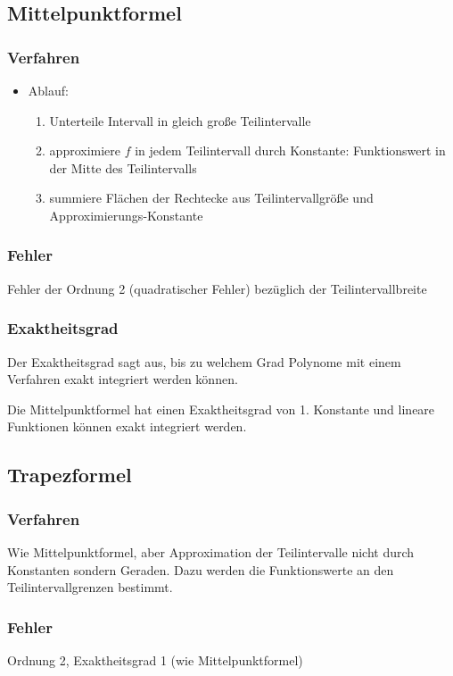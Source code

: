 \documentclass[a4paper, 12pt]{article}
\begin{document}
\begin{description}
\subsection{Mittelpunktformel}

\subsubsection*{Verfahren}
\begin{itemize}
  \item Ablauf:
    \begin{enumerate}
      \item Unterteile Intervall in gleich große Teilintervalle
      \item approximiere \(f\) in jedem Teilintervall durch Konstante: Funktionswert in der Mitte des Teilintervalls
      \item summiere Flächen der Rechtecke aus Teilintervallgröße und Ap\-pro\-xi\-mie\-rungs-Kon\-stan\-te
    \end{enumerate}
\end{itemize}

\subsubsection*{Fehler}
Fehler der Ordnung 2 (quadratischer Fehler) bezüglich der Teilintervallbreite

\subsubsection*{Exaktheitsgrad}
Der Exaktheitsgrad sagt aus, bis zu welchem Grad Polynome mit einem Verfahren exakt integriert werden können.

Die Mittelpunktformel hat einen Exaktheitsgrad von 1. Konstante und lineare Funktionen können exakt integriert werden.


\subsection{Trapezformel}

\subsubsection*{Verfahren}
Wie Mittelpunktformel, aber Approximation der Teilintervalle nicht durch Konstanten sondern Geraden. Dazu werden die Funktionswerte an den Teilintervallgrenzen bestimmt.

\subsubsection*{Fehler}
Ordnung 2, Exaktheitsgrad 1 (wie Mittelpunktformel)



\end{description}
\end{document}
